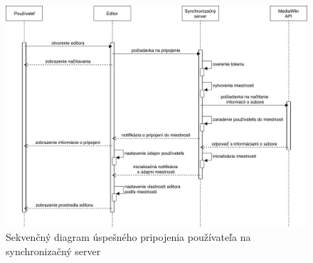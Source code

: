 \begin{figure}[h]
	\centerline{\includegraphics[width=1\textwidth]{images/diagrams/sequence-diagram-server-connect}}
	\caption[Sekvenčný diagram pripojenia používateľa]{Sekvenčný diagram úspešného pripojenia používateľa na synchronizačný server}
	\label{obr:sequence-diagram-server-connect}
\end{figure}
\FloatBarrier

